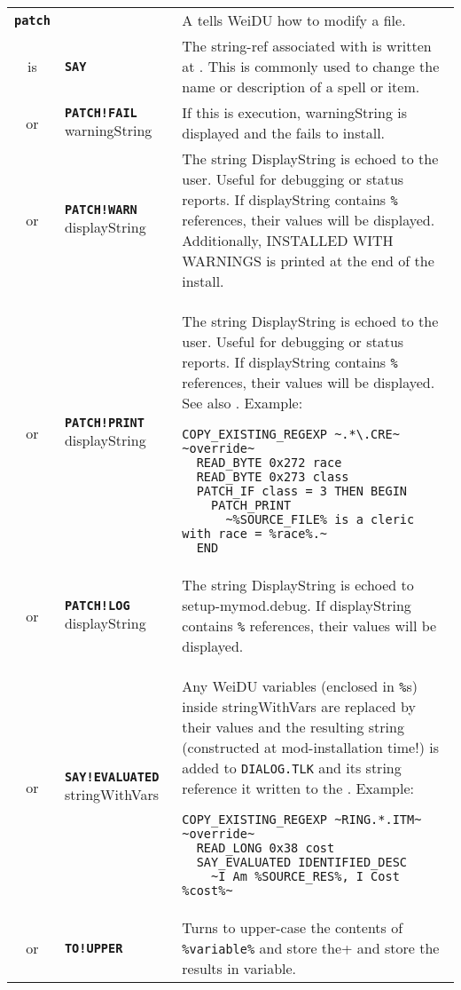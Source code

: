 \documentclass{article}
\def\ttref#1{\ahrefloc{#1}{\tt #1}}
\def\DEFINE#1{{\tt \bf #1}\label{#1}\index{#1}}
\def\DEFSYN#1{{\tt \bf #1}\index{#1}}
\def\t#1{{\tt #1}}
\begin{document}
\begin{tabular}{cp{10in}|p{10in}}
\DEFINE{patch} & & A \ttref{patch} tells WeiDU how to modify a file.  \\
is & \DEFSYN{SAY} \ttref{offset} \ttref{String} &
  The string-ref associated with \ttref{String} is written at
  \ttref{offset}. This is commonly used to change the name or
  description of a spell or item. \\
  or & \DEFINE{PATCH!FAIL} warningString &
    If this \ttref{TP2 Action} is execution, warningString is displayed and
    the \ttref{component} fails to install. \\
  or & \DEFINE{PATCH!WARN} displayString &
    The string DisplayString is echoed to the user. Useful for debugging or
    status reports. If displayString contains \t{\%}\ttref{variable}\t{\%}
    references, their values will be displayed. Additionally, INSTALLED WITH
    WARNINGS is printed at the end of the install.
    \\
  or & \DEFINE{PATCH!PRINT} displayString &
  The string DisplayString is echoed to the user. Useful for debugging or
  status reports. If displayString contains \t{\%}\ttref{variable}\t{\%}
  references, their values will be displayed. See also \ttref{PRINT}.
  Example:
\begin{verbatim}
COPY_EXISTING_REGEXP ~.*\.CRE~ ~override~
  READ_BYTE 0x272 race
  READ_BYTE 0x273 class
  PATCH_IF class = 3 THEN BEGIN
    PATCH_PRINT
      ~%SOURCE_FILE% is a cleric with race = %race%.~
  END
\end{verbatim} \\
  or & \DEFINE{PATCH!LOG} displayString &
    The string DisplayString is echoed to setup-mymod.debug.
    If displayString contains \t{\%}\ttref{variable}\t{\%}
    references, their values will be displayed. \\
or & \DEFINE{SAY!EVALUATED} \ttref{offset} stringWithVars &
  Any WeiDU variables (enclosed in \t{\%}s) inside stringWithVars are
  replaced by their values and the resulting string (constructed at
  mod-installation time!) is added to \t{DIALOG.TLK} and its string
  reference it written to the \ttref{offset}. Example:
\begin{verbatim}
COPY_EXISTING_REGEXP ~RING.*.ITM~ ~override~
  READ_LONG 0x38 cost
  SAY_EVALUATED IDENTIFIED_DESC
    ~I Am %SOURCE_RES%, I Cost %cost%~
\end{verbatim} \\
or & \DEFINE{TO!UPPER} \ttref{variable} &
  Turns to upper-case the contents of \verb+%variable%+ and store the
  results in variable. \\

\end{tabular}
\end{document}
